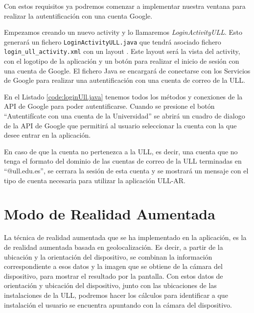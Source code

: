 Con estos requisitos ya podremos comenzar a implementar nuestra ventana para realizar la autentificación con una cuenta Google. 

Empezamos creando un nuevo activity y lo llamaremos \textit{LoginActivityULL}. Esto  generará un fichero \texttt{LoginActivityULL.java} que tendrá asociado fichero \texttt{login\_ull\_activity.xml} con un layout \cite{URL::layout}. Este layout será la vista del activity, con el logotipo de la aplicación y un botón para realizar el inicio de sesión con una cuenta de Google. El fichero Java se encargará de conectarse con los Servicios de Google para realizar una autentificación con una cuenta de correo de la ULL.
\bigskip
\bigskip
 
En el Listado \ref{code:loginUll.java} tenemos todos los métodos y conexiones de la API de Google para poder autentificarse. Cuando se presione el botón ``Autentifícate con una cuenta de la Universidad'' se abrirá un cuadro de dialogo de la API de Google que permitirá al usuario seleccionar la cuenta con la que desee entrar en la aplicación. 

En caso de que la cuenta no pertenezca a la ULL, es decir, una cuenta que no tenga el formato del dominio de las cuentas de correo de la ULL terminadas en ``@ull.edu.es'', se cerrara la sesión de esta cuenta y se mostrará un mensaje con el tipo de cuenta necesaria para utilizar la aplicación ULL-AR.

 
 
\section{Modo de Realidad Aumentada}

La técnica de realidad aumentada que se ha implementado en la aplicación, es la de realidad aumentada basada en geolocalización. Es decir, a partir de la ubicación y la orientación del dispositivo, se combinan la información correspondiente a esos datos y la imagen que se obtiene de la cámara del dispositivo, para mostrar el resultado por la pantalla. Con estos datos de orientación y ubicación del dispositivo, junto con las ubicaciones de las instalaciones de la ULL, podremos hacer los cálculos para identificar a que instalación el usuario se encuentra apuntando con la cámara del dispositivo.


